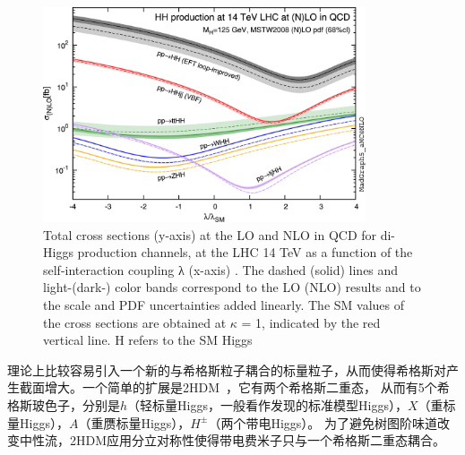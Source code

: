 \begin{figure}[h]
\centering
 \includegraphics[width=0.85\textwidth]{fig/HH_xs_kappa_14TeV.jpg}
  \caption{Total cross sections (y-axis) at the LO and NLO in QCD for di-Higgs production channels, at the LHC 14 TeV as a function of the self-interaction coupling λ (x-axis) . The dashed (solid) lines and light-(dark-) color bands correspond to the LO (NLO) results and to the scale and PDF uncertainties added linearly. The SM values of the cross sections are obtained at $\kappa$ = 1, indicated by the red vertical line. H refers to the SM Higgs}
  \label{fig:HH_xs_kappa_14TeV}
\end{figure}

理论上比较容易引入一个新的与希格斯粒子耦合的标量粒子，从而使得希格斯对产生截面增大。一个简单的扩展是2HDM~\cite{2HDMTheory}，它有两个希格斯二重态，
从而有5个希格斯玻色子，分别是$h$（轻标量Higgs，一般看作发现的标准模型Higgs），$X$（重标量Higgs），$A$（重赝标量Higgs），$H^{\pm}$（两个带电Higgs）。
为了避免树图阶味道改变中性流，2HDM应用分立对称性使得带电费米子只与一个希格斯二重态耦合。

